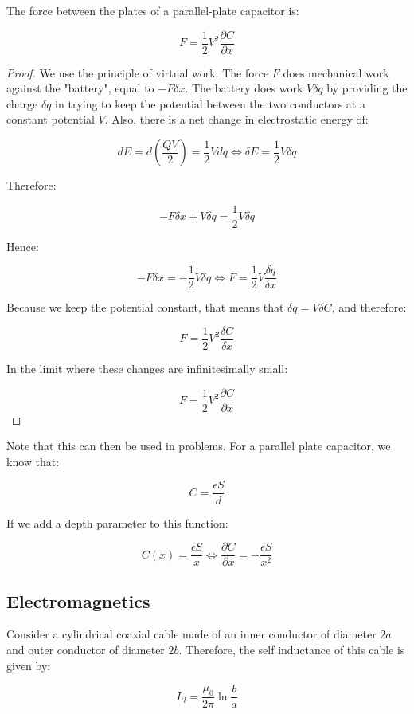 \documentclass{article}
\begin{document}
\begin{proposition}
    The force between the plates of a parallel-plate capacitor is:

    \[ F = \frac{1}{2}V^2\frac{\partial C}{\partial x} \]
\end{proposition}

\begin{proof}
    We use the principle of virtual work. The force $F$ does mechanical work against the "battery", equal to $-F \delta x$. The battery does work $V \delta q$ by providing the charge $\delta q$ in trying to keep the potential between the two conductors at a constant potential $V$. Also, there is a net change in electrostatic energy of:

    \[ dE = d\left(\frac{QV}{2}\right) = \frac{1}{2}Vdq \iff \delta E = \frac{1}{2}V \delta q \]

    Therefore:

    \[ -F \delta x + V \delta q = \frac{1}{2}V \delta q \]

    Hence:

    \[ -F\delta x = -\frac{1}{2}V\delta q \iff F = \frac{1}{2}V \frac{\delta q}{\delta x} \]

    Because we keep the potential constant, that means that $\delta q = V\delta C$, and therefore:

    \[ F = \frac{1}{2}V^2\frac{\delta C}{\delta x} \]

    In the limit where these changes are infinitesimally small:

    \[ F = \frac{1}{2}V^2\frac{\partial C}{\partial x} \]
\end{proof}

Note that this can then be used in problems. For a parallel plate capacitor, we know that:

\[ C = \frac{\epsilon S}{d} \]

If we add a depth parameter to this function:

\[ C(x) = \frac{\epsilon S}{x} \iff \frac{\partial C}{\partial x} = - \frac{\epsilon S}{x^2} \]

\subsection{Electromagnetics}

\begin{proposition}
    Consider a cylindrical coaxial cable made of an inner conductor of diameter $2a$ and outer conductor of diameter $2b$. Therefore, the self inductance of this cable is given by:

    \[ L_l = \frac{\mu_0}{2\pi}\ln{\frac{b}{a}} \]
\end{proposition}
\end{document}
